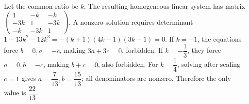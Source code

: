 Let the common ratio be $k$. The resulting homogeneous linear system has matrix $\begin{pmatrix}1&-k&-k\\-3k&1&-3k\\-k&-3k&1\end{pmatrix}$. A nonzero solution requires determinant $1-13k^2-12k^3=-(k+1)(4k-1)(3k+1)=0$. If $k=-1$, the equations force $b=0,a=-c$, making $3a+3c=0$, forbidden. If $k=-\dfrac{1}{3}$, they force $a=0,b=-c$, making $b+c=0$, also forbidden. For $k=\dfrac{1}{4}$, solving after scaling $c=1$ gives $a=\dfrac{7}{13},b=\dfrac{15}{13}$; all denominators are nonzero. Therefore the only value is $\boxed{\dfrac{22}{13}}$.
